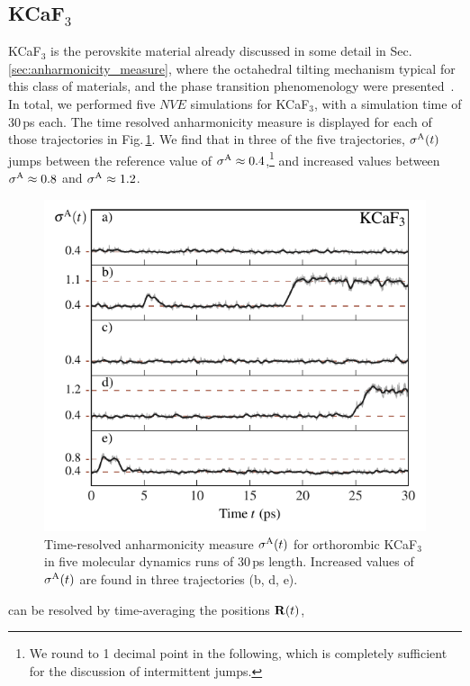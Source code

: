 \subsection{KCaF$_3$}
KCaF$_3$ is the perovskite material already discussed in some detail in Sec.\,\ref{sec:anharmonicity_measure}, where the octahedral tilting mechanism typical for this class of materials, and the phase transition phenomenology were presented~\cite{Bulou.1980,Hidaka.1984,Knight.2005}. In total, we performed five $NVE$ simulations for KCaF$_3$, with a simulation time of 30\,ps each. The time resolved anharmonicity measure is displayed for each of those trajectories in Fig.\,\ref{fig:defects.KCaF3.sigmaA}.
We find that in three of the five trajectories, $\sigma^\mathrm{A} (t)$ jumps between the reference value of $\sigma^\mathrm{A} \approx 0.4$,\footnote{We round to 1 decimal point in the following, which is completely sufficient for the discussion of intermittent jumps.} and increased values between $\sigma^\mathrm{A} \approx 0.8$ and $\sigma^\mathrm{A} \approx 1.2$.
%
\begin{figure}
	\includegraphics[width=\textwidth]{./data/plots/defects/062.05.KCaF3/sigma_vs_time.pdf}
	\caption{Time-resolved anharmonicity measure $\sigma^\mathrm{A} (t)$ for orthorombic KCaF$_3$ in five molecular dynamics runs of 30\,ps length. Increased values of $\sigma^\mathrm{A} (t)$ are found in three trajectories (b, d, e).}
	\label{fig:defects.KCaF3.sigmaA}
\end{figure}
%
 can be resolved by time-averaging the positions ${\bf R} (t)$,
